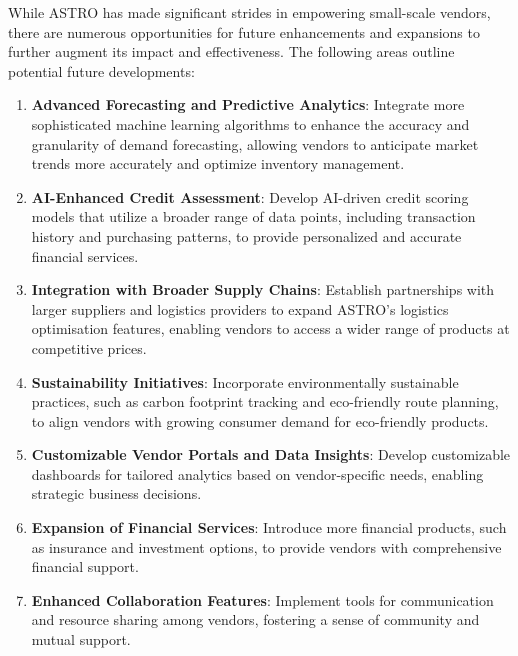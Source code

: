 
While ASTRO has made significant strides in empowering small-scale vendors, there are numerous opportunities for future enhancements and expansions to further augment its impact and effectiveness. The following areas outline potential future developments:

\begin{enumerate}
    \item \textbf{Advanced Forecasting and Predictive Analytics}: Integrate more sophisticated machine learning algorithms to enhance the accuracy and granularity of demand forecasting, allowing vendors to anticipate market trends more accurately and optimize inventory management.
    \item \textbf{AI-Enhanced Credit Assessment}: Develop AI-driven credit scoring models that utilize a broader range of data points, including transaction history and purchasing patterns, to provide personalized and accurate financial services.
    \item \textbf{Integration with Broader Supply Chains}: Establish partnerships with larger suppliers and logistics providers to expand ASTRO’s logistics optimisation features, enabling vendors to access a wider range of products at competitive prices.
    \item \textbf{Sustainability Initiatives}: Incorporate environmentally sustainable practices, such as carbon footprint tracking and eco-friendly route planning, to align vendors with growing consumer demand for eco-friendly products.
    \item \textbf{Customizable Vendor Portals and Data Insights}: Develop customizable dashboards for tailored analytics based on vendor-specific needs, enabling strategic business decisions.
    \item \textbf{Expansion of Financial Services}: Introduce more financial products, such as insurance and investment options, to provide vendors with comprehensive financial support.
    \item \textbf{Enhanced Collaboration Features}: Implement tools for communication and resource sharing among vendors, fostering a sense of community and mutual support.


\end{enumerate}
